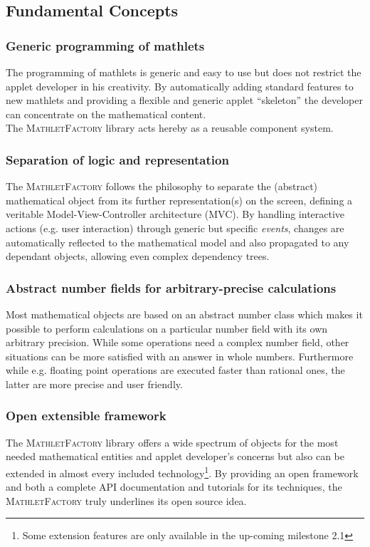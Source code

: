\documentclass[a4paper,12pt]{article}
\newcommand{\name}[1]{\textsc{#1}}
\newcommand{\mf}{\name{MathletFactory }}
\begin{document}
\newpage

\subsection{Fundamental Concepts}

\subsubsection*{Generic programming of mathlets}
The programming of mathlets is generic and easy to use but does not restrict the applet developer
in his creativity. By automatically adding standard features to new mathlets and providing a
flexible and generic applet ``skeleton'' the developer can concentrate on the mathematical content.\\
The \mf library acts hereby as a reusable component system.

\subsubsection*{Separation of logic and representation}
The \mf follows the philosophy to separate the (abstract) mathematical object from its further
representation(s) on the screen, defining a veritable Model-View-Controller architecture (MVC).
By handling interactive actions (e.g. user interaction) through generic but specific \textit{events}, 
changes are automatically reflected to the mathematical model and also propagated to any dependant 
objects, allowing even complex dependency trees.

\subsubsection*{Abstract number fields for arbitrary-precise calculations}
Most mathematical objects are based on an abstract number class which makes it possible to perform
calculations on a particular number field with its own arbitrary precision. While some operations
need a complex number field, other situations can be more satisfied with an answer in whole numbers.
Furthermore while e.g. floating point operations are executed faster than rational ones, the latter 
are more precise and user friendly.

\subsubsection*{Open extensible framework}
The \mf library offers a wide spectrum of objects for the most needed mathematical entities and 
applet developer's concerns but also can be extended in almost every included technology\footnote{
Some extension features are only available in the up-coming milestone 2.1}. By
providing an open framework and both a complete API documentation and tutorials for its techniques, 
the \mf truly underlines its open source idea.
\end{document}
